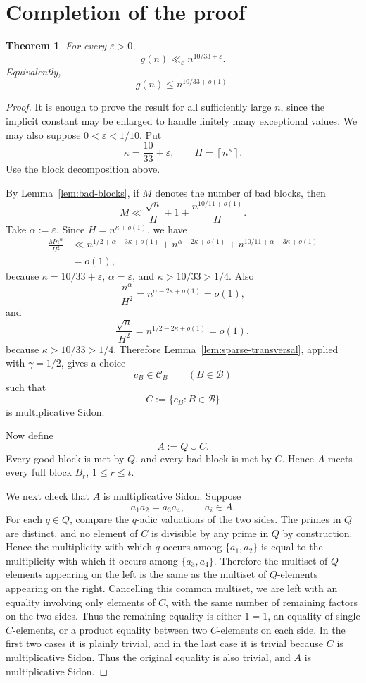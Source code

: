 \documentclass[11pt,reqno]{amsart}
\numberwithin{equation}{section}
\theoremstyle{plain}
\newtheorem{theorem}{Theorem}[section]
\theoremstyle{definition}
\newcommand{\eps}{\varepsilon}
\newcommand{\ceil}[1]{\left\lceil #1\right\rceil}
\begin{document}
\section{Completion of the proof}

\begin{theorem}
\label{thm:main}
For every $\eps>0$,
\[
        g(n)\ll_\eps n^{10/33+\eps}.
\]
Equivalently,
\[
        g(n)\le n^{10/33+o(1)}.
\]
\end{theorem}

\begin{proof}
It is enough to prove the result for all sufficiently large $n$, since the
implicit constant may be enlarged to handle finitely many exceptional values.
We may also suppose $0<\eps<1/10$.  Put
\[
        \kappa=\frac{10}{33}+\eps,
        \qquad H=\ceil{n^\kappa}.
\]
Use the block decomposition above.

By Lemma~\ref{lem:bad-blocks}, if \(M\) denotes the number of bad blocks, then
\[
        M \ll \frac{\sqrt n}{H}+1+\frac{n^{10/11+o(1)}}{H}.
\]
Take \(\alpha:=\eps\).  Since \(H=n^{\kappa+o(1)}\), we have
\[
\begin{aligned}
        \frac{M n^\alpha}{H^2}
        &\ll
        n^{1/2+\alpha-3\kappa+o(1)}
        +
        n^{\alpha-2\kappa+o(1)}
        +
        n^{10/11+\alpha-3\kappa+o(1)}        \\
        &=o(1),
\end{aligned}
\]
because \(\kappa=10/33+\eps\), \(\alpha=\eps\), and \(\kappa>10/33>1/4\). Also
\[
        \frac{n^\alpha}{H^2}
        =
        n^{\alpha-2\kappa+o(1)}
        =
        o(1),
\]
and
\[
        \frac{\sqrt n}{H^2}
        =
        n^{1/2-2\kappa+o(1)}
        =
        o(1),
\]
because \(\kappa>10/33>1/4\).  Therefore Lemma~\ref{lem:sparse-transversal},
applied with \(\gamma=1/2\), gives a choice
\[
        c_B\in\mathcal C_B \qquad (B\in\mathcal B)
\]
such that
\[
        C:=\{c_B:B\in\mathcal B\}
\]
is multiplicative Sidon.

Now define
\[
        A:=Q\cup C.
\]
Every good block is met by $Q$, and every bad block is met by $C$.  Hence
$A$ meets every full block $B_r$, $1\le r\le t$.

We next check that $A$ is multiplicative Sidon.  Suppose
\[
        a_1a_2=a_3a_4,
        \qquad a_i\in A.
\]
For each $q\in Q$, compare the $q$-adic valuations of the two sides.  The primes
in $Q$ are distinct, and no element of $C$ is divisible by any prime in $Q$ by
construction.  Hence the multiplicity with which $q$ occurs among
$\{a_1,a_2\}$ is equal to the multiplicity with which it occurs among
$\{a_3,a_4\}$.  Therefore the multiset of $Q$-elements appearing on the left is
the same as the multiset of $Q$-elements appearing on the right.  Cancelling this common multiset, we are left with an equality involving only
elements of \(C\), with the same number of remaining factors on the two sides.
Thus the remaining equality is either \(1=1\), an equality of single
\(C\)-elements, or a product equality between two \(C\)-elements on each side.
In the first two cases it is plainly trivial, and in the last case it is
trivial because \(C\) is multiplicative Sidon.  Thus the original equality is
also trivial, and \(A\) is multiplicative Sidon.


\end{proof}
\end{document}
